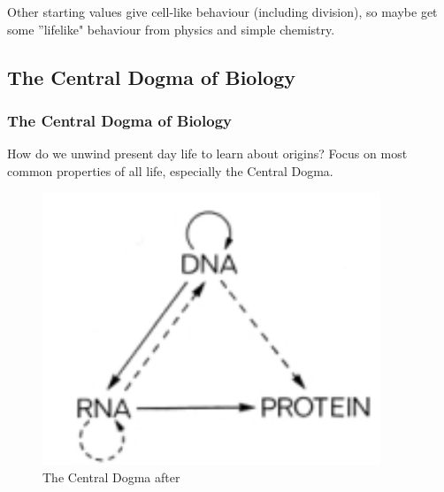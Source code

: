 \documentclass[]{article}
\begin{document}
Other starting values give cell-like behaviour (including division), so maybe get some ''lifelike" behaviour from physics and simple chemistry.

\subsection{The Central Dogma of Biology}


\subsubsection{The Central Dogma of Biology}

How do we unwind present day life to learn about origins? Focus on most common properties of all life, especially the Central Dogma.\cite{crick1958biological} \cite{crick1970central}

\begin{figure}[H]
	\caption{The Central Dogma after \cite{crick1970central}}\label{fig:CentralDogma} 
	\includegraphics[width=0.9\textwidth]{CentralDogma}
\end{figure}
\end{document}
